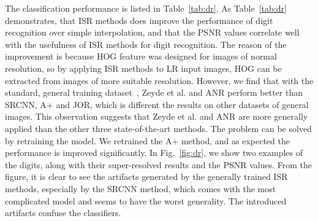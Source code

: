 \documentclass[10pt,twocolumn,letterpaper]{article}
\begin{document}
The classification performance is listed in Table~\ref{tab:dr}. As Table~\ref{tab:dr} demonstrates, that ISR methods does improve the performance of digit recognition over simple interpolation, and that the PSNR values correlate well with the usefulness of ISR methods for digit recognition. The reason of the improvement is because HOG feature was designed for images of normal resolution, so by applying ISR methods to LR input images, HOG can be extracted from images of more suitable resolution.   
However, we find that with the standard, general training dataset~\cite{Yang-TIP-2010}, Zeyde et al. and ANR perform better than SRCNN, A+ and JOR, which is different the results on other datasets of general images. 
This observation suggests that Zeyde et al. and ANR are more generally applied than the other three state-of-the-art methods. The problem can be solved by retraining the model. We retrained the A+ method, and as expected the performance is improved significantly. In Fig.~\ref{fig:dr}, we show two examples of the digits, along with their super-resolved results and the PSNR values. From the figure, it is clear to see the artifacts generated by the generally trained ISR methods, especially by the SRCNN method, which comes with the most complicated model and seems to have the worst generality. The introduced artifacts confuse the classifiers.  



\end{document}
